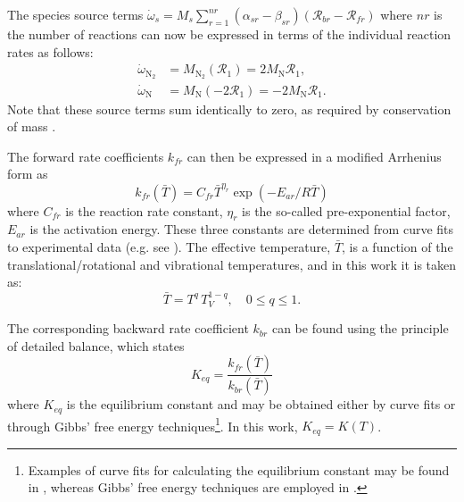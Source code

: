 \documentclass[10pt]{article}
\begin{document}
The species source terms $\dot{\omega}_s = M_s \sum_{r=1}^{nr}\left(\alpha_{sr}-\beta_{sr}\right)\left(\mathcal{R}_{br} - \mathcal{R}_{fr}\right)$ 
 where $nr$ is the number of reactions can now be expressed in terms of the individual reaction rates as follows:
\begin{align*}
 \dot{\omega}_{\text{N}_2} &= M_{\text{N}_2}\left(\mathcal{R}_1\right)= 2 M_\text{N} \mathcal{R}_1 ,\\
 \dot{\omega}_{\text{N}} &= M_{\text{N}}\left(-2\mathcal{R}_1 \right)=-2 M_\text{N} \mathcal{R}_1. 
\end{align*}
Note that these source terms sum identically to zero, as required by conservation of mass \citep{Kessler2004}.



The forward rate coefficients  $k_{fr}$  can then be expressed in a modified Arrhenius form as
\begin{equation}\label{eq:equilibrium_constant}
  k_{fr}\left(\bar{T}\right) = C_{fr} \bar{T}^{\eta_r} \exp \left(-E_{ar}/R\bar{T}\right)
\end{equation}
where $C_{fr}$ is the reaction rate constant, $\eta_r$ is the so-called pre-exponential factor, $E_{ar}$ is the activation energy.  These three constants are determined from curve fits to experimental data (e.g. see \cite{Ait1996}). The effective temperature, $\bar{T}$, is a function of the translational/rotational and vibrational temperatures, and in this work it is taken as:
\begin{equation}
	\label{eq:Tbar}
\bar{T}=T^{q} \, T_V^{1-q}, \quad 0\leq q\leq 1 .
\end{equation}


The corresponding backward rate coefficient   $k_{br}$  can be found using the principle of detailed balance, which states
\begin{equation}
  K_{eq} = \frac{k_{fr}\left(\bar{T}\right)}{k_{br}\left(\bar{T}\right)}
\end{equation}
where $K_{eq}$ is the equilibrium constant and may be obtained either by curve fits or through Gibbs' free energy techniques\footnote{Examples of curve fits for calculating the equilibrium constant may be found in \citet{Park1990}, whereas Gibbs' free energy techniques are employed in \citet{Nasa_chemistry}. }. 
In this work, $K_{eq}=K(T)$.
\end{document}
